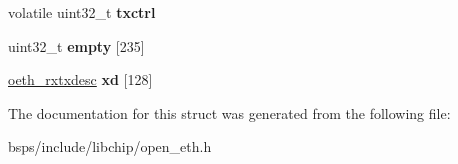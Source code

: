\begin{DoxyCompactItemize}
volatile uint32\+\_\+t {\bfseries txctrl}
\item 
\mbox{\label{struct__oeth__regs_a70a5ea4a0431087367c342acb650aba7}} 
uint32\+\_\+t {\bfseries empty} \mbox{[}235\mbox{]}
\item 
\mbox{\label{struct__oeth__regs_aa2b1a7ec3f4319bb113e830d28e8a998}} 
\mbox{\hyperlink{struct__oeth__rxtxdesc}{oeth\+\_\+rxtxdesc}} {\bfseries xd} \mbox{[}128\mbox{]}
\end{DoxyCompactItemize}


The documentation for this struct was generated from the following file\+:\begin{DoxyCompactItemize}
\item 
bsps/include/libchip/open\+\_\+eth.\+h\end{DoxyCompactItemize}
